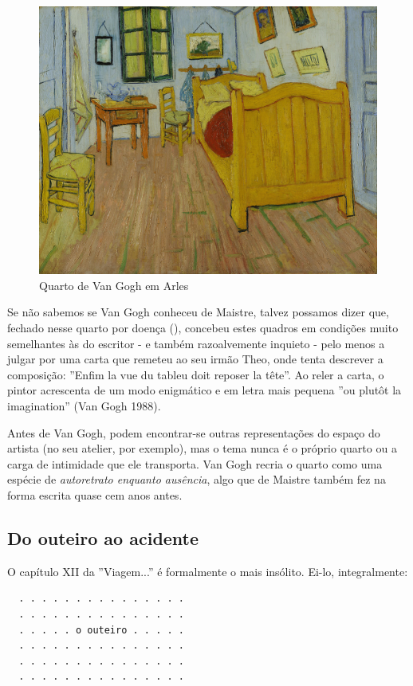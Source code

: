 \documentclass[12pt]{article}
\begin{document}
\begin{figure}
  \label{fig:1}
  \centering\includegraphics[height=0.6\textheight,keepaspectratio] {slaapkamer.jpg}
  \caption{Quarto de Van Gogh em Arles}
\end{figure}

Se não sabemos se Van Gogh conheceu de Maistre, talvez possamos dizer
que, fechado nesse quarto por doença (\cite{goghroom}), concebeu estes
quadros em condições muito semelhantes às do escritor - e também
razoalvemente inquieto - pelo menos a julgar por uma carta que remeteu
ao seu irmão Theo, onde tenta descrever a composição: ''Enfim la vue
du tableu doit reposer la tête''. Ao reler a carta, o pintor
acrescenta de um modo enigmático e em letra mais pequena ''ou plutôt
la imagination'' (Van Gogh 1988).

Antes de Van Gogh, podem encontrar-se outras representações do espaço
do artista (no seu atelier, por exemplo), mas o tema nunca é o próprio
quarto ou a carga de intimidade que ele transporta. Van Gogh recria o
quarto como uma espécie de \emph{autoretrato enquanto ausência}, algo
que de Maistre também fez na forma escrita quase cem anos antes.

\subsection{Do outeiro ao acidente}

O capítulo XII da ''Viagem...'' é formalmente o mais insólito. Ei-lo,
integralmente:

\begin{verbatim}
  . . . . . . . . . . . . . . .
  . . . . . . . . . . . . . . .
  . . . . . o outeiro . . . . .
  . . . . . . . . . . . . . . .
  . . . . . . . . . . . . . . .
  . . . . . . . . . . . . . . .
\end{verbatim}
\end{document}

